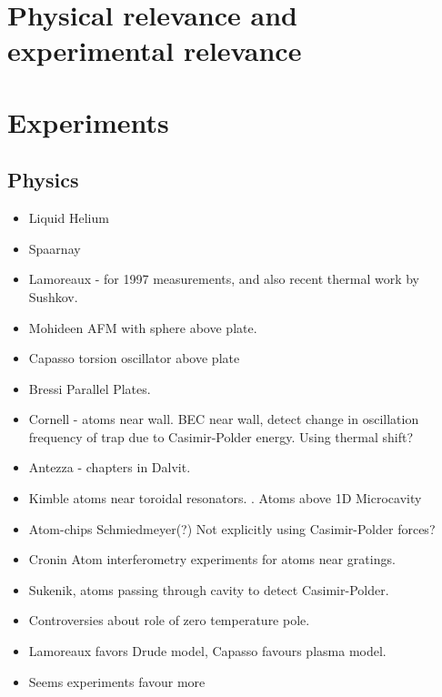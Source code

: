 \section{Physical relevance and experimental relevance}

\section{Experiments}
\subsection{Physics}
\begin{itemize}
\item Liquid Helium
\item Spaarnay
\item Lamoreaux - for 1997 measurements\cite{Lamoreaux1997}, and also recent thermal work by Sushkov\cite{Sushkov2011}.

\item Mohideen \cite{Mohideen1998} AFM with sphere above plate.

\item Capasso \cite{Chan2001}  torsion oscillator above plate
\item Bressi \cite{Bressi2002} Parallel Plates.
\item Cornell - atoms near wall\cite{Harber2005, Obrecht2007}.  BEC near wall, detect change in oscillation frequency of trap due to Casimir-Polder energy.  Using thermal shift?
\item Antezza - chapters in Dalvit.  
\item Kimble atoms near toroidal resonators.  \cite{Alton2011}.  Atoms above 1D Microcavity \cite{Hung2013}
\item Atom-chips  Schmiedmeyer\cite{Folman2000,Schneider2003}(?)  Not explicitly using Casimir-Polder forces?  
\item Cronin \cite{Perreault2005,Lonij2009}  Atom interferometry experiments for atoms near gratings.
\item Sukenik\cite{Sukenik1993}, atoms passing through cavity to detect Casimir-Polder.  
\end{itemize}

\begin{itemize}
\item Controversies about role of zero temperature pole.  
\item Lamoreaux favors Drude model, Capasso favours plasma model.
\item Seems experiments favour more 
\end{itemize}

